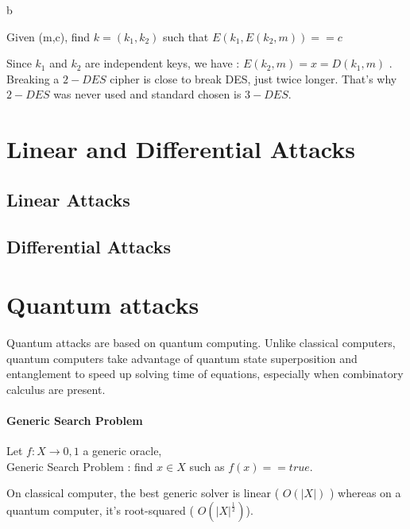 \begin{mydef}[Challenge :]
b \newline
\begin{minipage}[t]{0.9\textwidth}
	Given (m,c), find $k = (k_1,k_2)$ such that $E(k_1,E(k_2,m)) == c$
\end{minipage}
\end{mydef}

Since $k_1$ and $k_2$ are independent keys, we have : $E(k_2,m) = x = D(k_1,m) $ . Breaking a $2-DES$ cipher is close to break DES, just twice longer. That's why $2-DES$ was never used and standard chosen is $3-DES$.

\section{Linear and Differential Attacks}

\subsection{Linear Attacks}
\subsection{Differential Attacks}


\section{Quantum attacks}

Quantum attacks are based on quantum computing. Unlike classical computers, quantum computers take advantage of quantum state superposition and entanglement to speed up solving time of equations, especially when combinatory calculus are present.

\paragraph{Generic Search Problem}

\begin{mydef}
\begin{minipage}[t]{0.8\textwidth}
    Let $f : X \rightarrow {0,1}$ a generic oracle, \\
  	Generic Search Problem : find $x \in X$ such as $ f(x) == true $.
\end{minipage}
\end{mydef}

On classical computer, the best generic solver is linear ( $O(|X|)$ ) whereas on a quantum computer, it's root-squared ( $O(|X|^{\frac{1}{2}})$).


